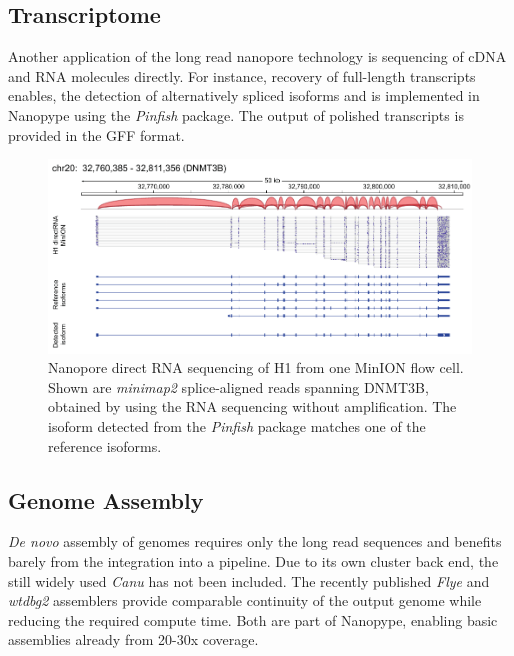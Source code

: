 \subsection{Transcriptome}
\label{subsec:nanopype:transcriptom}
Another application of the long read nanopore technology is sequencing of cDNA and RNA molecules directly. For instance, recovery of full-length transcripts enables, the detection of alternatively spliced isoforms and is implemented in Nanopype using the \textit{Pinfish} package. The output of polished transcripts is provided in the GFF format.

\begin{figure}[h]
	\centering
	\includegraphics[width=1.0\textwidth]{figures/nanopype/rna_isoforms.pdf}
	\captionsetup{format=plain}
	\caption[Nanopore direct RNA sequencing]{Nanopore direct RNA sequencing of H1 from one MinION flow cell. Shown are \textit{minimap2} splice-aligned reads spanning DNMT3B, obtained by using the RNA sequencing without amplification. The isoform detected from the \textit{Pinfish} package matches one of the reference isoforms.}
	\label{fig:nanopype:rna_isoforms}
\end{figure}


\subsection{Genome Assembly}
\label{subsec:nanopype:assembly}

\textit{De novo} assembly of genomes requires only the long read sequences and benefits barely from the integration into a pipeline. Due to its own cluster back end, the still widely used \textit{Canu} \cite{Koren2017} has not been included. The recently published \textit{Flye} \cite{Kolmogorov2019} and \textit{wtdbg2} \cite{Ruan2020} assemblers provide comparable continuity of the output genome while reducing the required compute time. Both are part of Nanopype, enabling basic assemblies already from 20-30x coverage.

